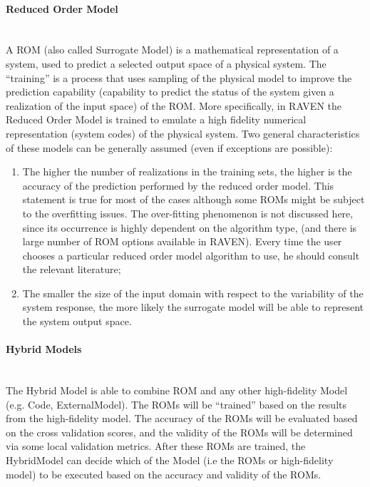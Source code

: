\paragraph{Reduced Order Model} ~\\
 A ROM (also called Surrogate Model) is a mathematical representation of a system, used to predict a selected output 
 space of a physical system.
The ``training'' is a process that uses sampling of the physical model to improve the prediction capability (capability to 
predict the status of the system given a realization of the input space) of the ROM. More specifically, in RAVEN the 
Reduced Order Model is trained to emulate a high fidelity numerical representation (system codes) of the physical system. 
Two general characteristics of these models can be generally assumed (even if exceptions are possible):
\begin{enumerate}
   \item The higher the number of realizations in the training sets, the higher is the accuracy of the prediction performed by 
   the reduced order model. This statement is true for most of the cases although some ROMs might be subject to the overfitting issues. The over-fitting phenomenon is not discussed here, since its occurrence is highly dependent on the 
   algorithm type, (and there is large number of ROM options available in RAVEN). Every time the user chooses a particular 
   reduced order model algorithm to use, he should consult the relevant literature;
   \item The smaller the size of the input domain with respect to the variability of the system response, the more likely the 
   surrogate model will be able to represent the system output space.
\end{enumerate}


\paragraph{Hybrid Models} ~\\
The Hybrid Model is able to combine ROM and any other high-fidelity Model (e.g. Code, ExternalModel). 
The ROMs will be 
``trained'' based on the results from the high-fidelity model. The accuracy of the ROMs will be evaluated based on the 
cross validation scores, and the validity of the ROMs will be determined via some local validation metrics. After these 
ROMs are trained, the HybridModel can decide which of the Model (i.e the ROMs or  high-fidelity model) to be executed 
based on the accuracy and validity of the ROMs.

